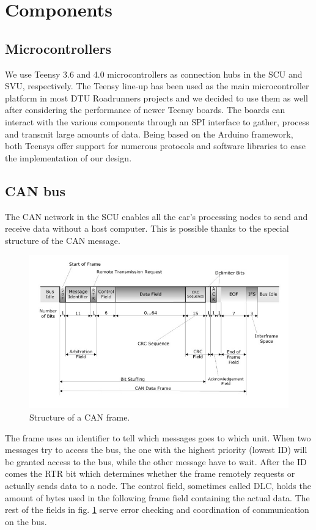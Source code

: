 \documentclass[conference]{IEEEtran}
\begin{document}
\section{Components}

\subsection{Microcontrollers} %
We use Teensy 3.6 and 4.0 microcontrollers as connection hubs in the SCU and SVU, respectively. The Teensy line-up has been used as the main microcontroller platform in most DTU Roadrunners projects and we decided to use them as well after considering the performance of newer Teensy boards. The boards can interact with the various components through an SPI interface to gather, process and transmit large amounts of data. Being based on the Arduino framework, both Teensys offer support for numerous protocols and software libraries to ease the implementation of our design. 

\subsection{CAN bus}
The CAN network in the SCU enables all the car's processing nodes to send and receive data without a host computer. This is possible thanks to the special structure of the CAN message.

\begin{figure}[h]
    \centering
    \includegraphics[scale=0.35]{documentation/images/detailed-can-data-frame-architecture.jpg}
    \caption{Structure of a CAN frame.}
    \label{fig:CANframe}
\end{figure}

The frame uses an identifier to tell which messages goes to which unit. When two messages try to access the bus, the one with the highest priority (lowest ID) will be granted access to the bus, while the other message have to wait. After the ID comes the RTR bit which determines whether the frame remotely requests or actually sends data to a node. The control field, sometimes called DLC, holds the amount of bytes used in the following frame field containing the actual data. The rest of the fields in fig. \ref{fig:CANframe} serve error checking and coordination of communication on the bus.
\end{document}
